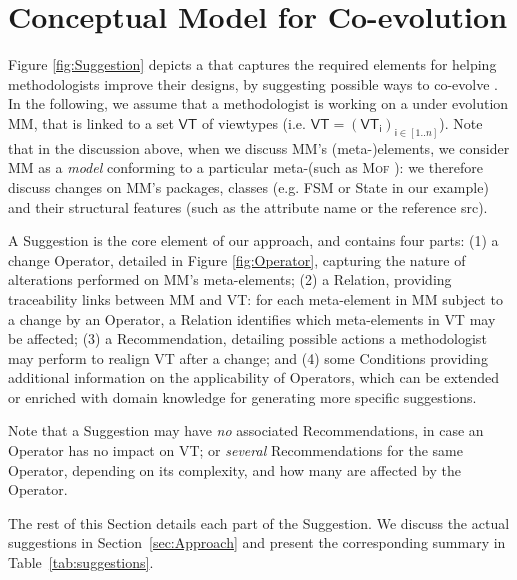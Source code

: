 \section{Conceptual Model for \Viewtype Co-evolution}
\label{sec:Suggestion}

Figure \ref{fig:Suggestion} depicts a \metamodel that captures the
required elements for helping methodologists improve their \viewtype designs,
by suggesting possible ways to co-evolve \viewtypes.
In the following, we assume that a methodologist is working on a \metamodel
under evolution \textsf{MM}, that is linked to a set $\mathsf{VT}$ of viewtypes
(i.e. $\mathsf{VT} = (\mathsf{VT}_\mathsf{i})_{\mathsf{i}\in [1..n]}$). Note that in the discussion above, when we discuss
\textsf{MM}'s (meta-)elements, we consider \textsf{MM} as a \emph{model}
conforming to a particular meta-\metamodel (such as \textsc{Mof} \cite{TR:OMG-MOF:2016}):
we therefore discuss changes on \textsf{MM}'s packages, classes (e.g. 
\textsf{FSM} or \textsf{State} in our example) and their structural features
(such as the attribute \textsf{name} or the reference \textsf{src}).

A \textsf{Suggestion} is the core element of our approach, and contains four 
parts: (1) a change \textsf{Operator}, detailed in Figure \ref{fig:Operator}, capturing the nature of
alterations performed on \textsf{MM}'s meta-elements; 
    (2) a \textsf{Relation}, providing traceability links between \textsf{MM} 
		and \textsf{VT}: for each meta-element in \textsf{MM} subject to a 
		change by an \textsf{Operator}, a \textsf{Relation} identifies which 
		meta-elements in \textsf{VT} may be affected;
    (3) a \textsf{Recommendation}, detailing possible actions a methodologist 
		may perform to realign \textsf{VT} after a change;
		 and (4) some \textsf{Condition}s providing additional information on the
		applicability of \textsf{Operator}s, which can be extended or enriched with domain knowledge for generating more specific suggestions.

Note that a \textsf{Suggestion} may 
have \emph{no} associated \textsf{Recommendation}s, in case an \textsf{Operator} has no
impact on \textsf{VT}; or \emph{several} \textsf{Recommendation}s for the same 
\textsf{Operator}, depending on its complexity, and how many \viewtypes are 
affected by the \textsf{Operator}.

The rest of this Section details each part of the \textsf{Suggestion}. We discuss the actual suggestions in Section~\ref{sec:Approach} and present the corresponding summary in Table~\ref{tab:suggestions}.






